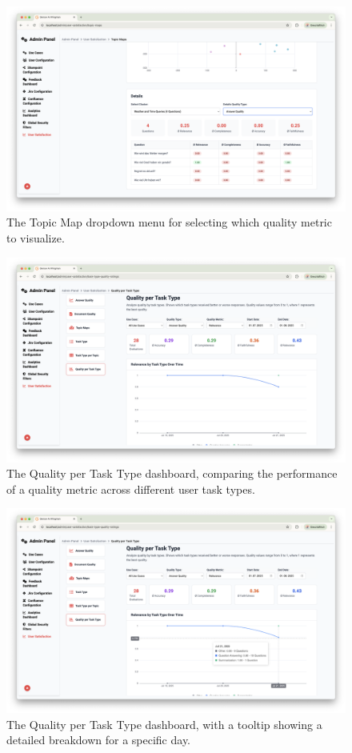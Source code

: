 \documentclass[
	english,
	ruledheaders=section,%
	class=report,%
	thesis={type=bachelor},%
	accentcolor=1b,%
	custommargins=true,%
	marginpar=false,%
	parskip=half-,%
	fontsize=11pt,%
	DIV=14,
]{tudapub}
\begin{document}
\begin{figure}[h!]
    \centering
    \includegraphics[width=0.75\linewidth]{images/TopicMaps6.png}
    \caption{The Topic Map dropdown menu for selecting which quality metric to visualize.}
    \label{fig:topic_maps_menu}
\end{figure}

\begin{figure}[h!]
    \centering
    \includegraphics[width=0.75\linewidth]{images/QualityPerTaskType.png}
    \caption{The Quality per Task Type dashboard, comparing the performance of a quality metric across different user task types.}
    \label{fig:quality_per_task}
\end{figure}

\begin{figure}[h!]
    \centering
    \includegraphics[width=0.75\linewidth]{images/QualityPerTaskTypeTooltip.png}
    \caption{The Quality per Task Type dashboard, with a tooltip showing a detailed breakdown for a specific day.}
    \label{fig:quality_per_task_tooltip}
\end{figure}
\end{document}
